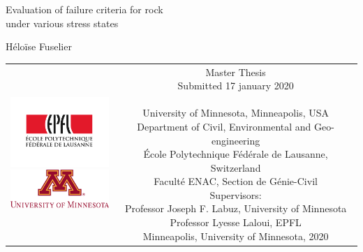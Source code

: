 
\begin{titlepage}
    \begin{center}
    \sffamily
    
    
    \null\vspace{2cm}
    {\huge Evaluation of failure criteria for rock \\[12pt] under various stress states} \\[24pt] 
    
    \vspace{3cm}
    
    {\LARGE Héloïse Fuselier}
        
    \vfill
    
    \begin{tabular} {cc}
    \parbox{0.3\textwidth}{\includegraphics[width=4cm]
    {images/epfl} \\[30pt]
    \includegraphics[width=4cm]
    {images/UofM2}}
    &
    \parbox{0.7\textwidth}{
        Master Thesis \\
        Submitted 17 january 2020\\
        \\
        University of Minnesota, Minneapolis, USA\\
        Department of Civil, Environmental and Geo-engineering \\
        École Polytechnique Fédérale de Lausanne, Switzerland\\
        Faculté ENAC, Section de Génie-Civil\\[6pt]
        
        
    
        Supervisors:\\[4pt]
        Professor Joseph F. Labuz, University of Minnesota\\    
        Professor Lyesse Laloui, EPFL\\[12pt]
            
        Minneapolis, University of Minnesota, 2020}
    \end{tabular}
    \end{center}
    \vspace{1cm}
    \end{titlepage}
    